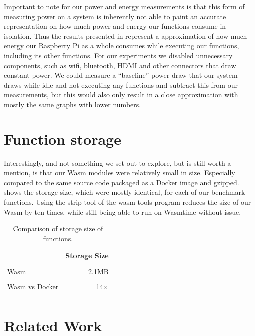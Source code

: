 \documentclass[
  table]{report}
\begin{document}
Important to note for our power and energy measurements is that this
form of measuring power on a system is inherently not able to paint an
accurate representation on how much power and energy our functions
consume in isolation. Thus the results presented in 
represent a approximation of how much energy our Raspberry Pi as a whole
consumes while executing our functions, including its other functions.
For our experiments we disabled unnecessary components, such as wifi,
bluetooth, HDMI and other connectors that draw constant power. We could
measure a ``baseline'' power draw that our system draws while idle and
not executing any functions and subtract this from our measurements, but
this would also only result in a close approximation with mostly the
same graphs with lower numbers.

\section{Function storage}
\label{sect:func_storage}

Interestingly, and not something we set out to explore, but is still
worth a mention, is that our \ac{Wasm} modules were relatively small in
size. Especially compared to the same source code packaged as a Docker
image and gzipped.  shows the storage size,
which were mostly identical, for each of our benchmark functions. Using
the strip-tool of the wasm-tools program reduces the size of our
\ac{Wasm} by ten times, while still being able to run on Wasmtime
without issue.

\begin{table}[H]
\centering
\caption{\label{tab:unnamed-chunk-3}Comparison of storage size of functions.\label{tab:function_sizes}}
\centering
\begin{tabular}[t]{lr}
\toprule
 & Storage Size\\
\midrule
\cellcolor{gray!10}{Docker} & \cellcolor{gray!10}{32MB}\\
Wasm & 2.1MB\\
\cellcolor{gray!10}{Wasm (stripped)} & \cellcolor{gray!10}{236KB}\\
Wasm vs Docker & 14×\\
\cellcolor{gray!10}{Wasm (stripped) vs Docker} & \cellcolor{gray!10}{138×}\\
\bottomrule
\end{tabular}
\end{table}

\section{Related Work}
\label{sect:related-work}
\end{document}
